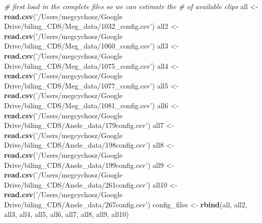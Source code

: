 \documentclass[
]{article}
\newenvironment{Shaded}{\begin{snugshade}}{\end{snugshade}}
\newcommand{\CommentTok}[1]{\textcolor[rgb]{0.56,0.35,0.01}{\textit{#1}}}
\newcommand{\KeywordTok}[1]{\textcolor[rgb]{0.13,0.29,0.53}{\textbf{#1}}}
\newcommand{\NormalTok}[1]{#1}
\newcommand{\StringTok}[1]{\textcolor[rgb]{0.31,0.60,0.02}{#1}}
\begin{document}
\begin{Shaded}
\begin{Highlighting}[]
{{{{{{{{{{{{{\CommentTok{# first load in the complete files so we can estimate the # of available clips}
\NormalTok{all <-}\StringTok{ }\KeywordTok{read.csv}\NormalTok{(}\StringTok{'/Users/megcychosz/Google Drive/biling_CDS/Meg_data/1032_config.csv'}\NormalTok{)}
\NormalTok{all2 <-}\StringTok{ }\KeywordTok{read.csv}\NormalTok{(}\StringTok{'/Users/megcychosz/Google Drive/biling_CDS/Meg_data/1060_config.csv'}\NormalTok{)}
\NormalTok{all3 <-}\StringTok{ }\KeywordTok{read.csv}\NormalTok{(}\StringTok{'/Users/megcychosz/Google Drive/biling_CDS/Meg_data/1075_config.csv'}\NormalTok{)}
\NormalTok{all4 <-}\StringTok{ }\KeywordTok{read.csv}\NormalTok{(}\StringTok{'/Users/megcychosz/Google Drive/biling_CDS/Meg_data/1077_config.csv'}\NormalTok{)}
\NormalTok{all5 <-}\StringTok{ }\KeywordTok{read.csv}\NormalTok{(}\StringTok{'/Users/megcychosz/Google Drive/biling_CDS/Meg_data/1081_config.csv'}\NormalTok{)}
\NormalTok{all6 <-}\StringTok{ }\KeywordTok{read.csv}\NormalTok{(}\StringTok{'/Users/megcychosz/Google Drive/biling_CDS/Anele_data/179config.csv'}\NormalTok{)}
\NormalTok{all7 <-}\StringTok{ }\KeywordTok{read.csv}\NormalTok{(}\StringTok{'/Users/megcychosz/Google Drive/biling_CDS/Anele_data/198config.csv'}\NormalTok{)}
\NormalTok{all8 <-}\StringTok{ }\KeywordTok{read.csv}\NormalTok{(}\StringTok{'/Users/megcychosz/Google Drive/biling_CDS/Anele_data/199config.csv'}\NormalTok{)}
\NormalTok{all9 <-}\StringTok{ }\KeywordTok{read.csv}\NormalTok{(}\StringTok{'/Users/megcychosz/Google Drive/biling_CDS/Anele_data/261config.csv'}\NormalTok{)}
\NormalTok{all10 <-}\StringTok{ }\KeywordTok{read.csv}\NormalTok{(}\StringTok{'/Users/megcychosz/Google Drive/biling_CDS/Anele_data/267config.csv'}\NormalTok{)}
\NormalTok{config_files <-}\StringTok{ }\KeywordTok{rbind}\NormalTok{(all, all2, all3, all4, all5, all6, all7, all8, all9, all10)}

}}}}}}}}}}}}}
\end{Highlighting}
\end{Shaded}
\end{document}
